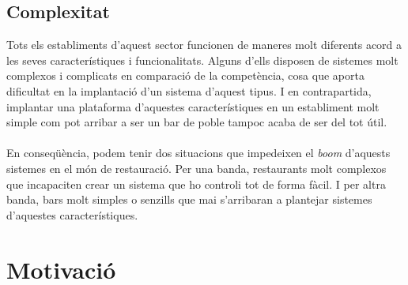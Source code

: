 \newpage
\subsection{Complexitat}

Tots els establiments d'aquest sector funcionen de maneres molt diferents acord a les seves característiques i funcionalitats. Alguns d'ells disposen de sistemes molt complexos i complicats en comparació de la competència, cosa que aporta dificultat en la implantació d'un sistema d'aquest tipus. I en contrapartida, implantar una plataforma d'aquestes característiques en un establiment molt simple com pot arribar a ser un bar de poble tampoc acaba de ser del tot útil.
\\\\
En conseqüència, podem tenir dos situacions que impedeixen el \textit{boom} d'aquests sistemes en el món de restauració. Per una banda, restaurants molt complexos que incapaciten crear un sistema que ho controli tot de forma fàcil. I per altra banda, bars molt simples o senzills que mai s'arribaran a plantejar sistemes d'aquestes característiques.


\section{Motivació}

